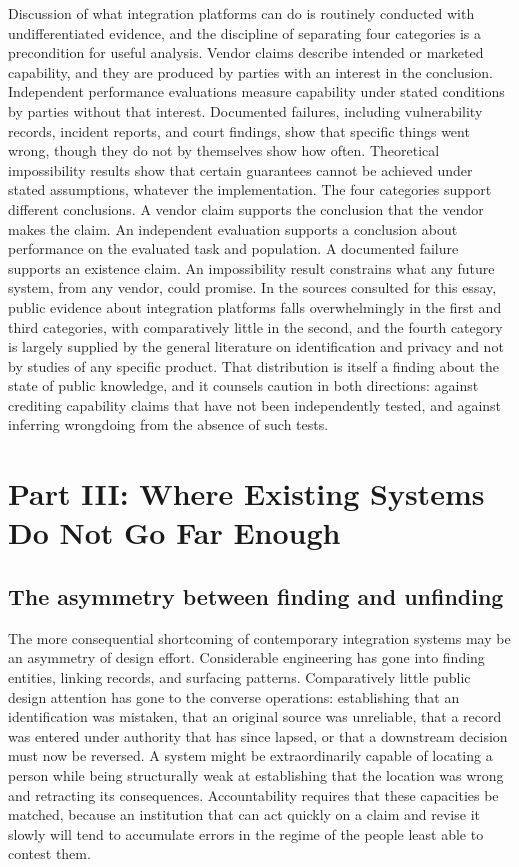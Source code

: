 \documentclass[11pt]{article}
\theoremstyle{plain}
\theoremstyle{definition}
\theoremstyle{remark}
\begin{document}
Discussion of what integration platforms can do is routinely conducted with undifferentiated evidence, and the discipline of separating four categories is a precondition for useful analysis. Vendor claims describe intended or marketed capability, and they are produced by parties with an interest in the conclusion. Independent performance evaluations measure capability under stated conditions by parties without that interest. Documented failures, including vulnerability records, incident reports, and court findings, show that specific things went wrong, though they do not by themselves show how often. Theoretical impossibility results show that certain guarantees cannot be achieved under stated assumptions, whatever the implementation. The four categories support different conclusions. A vendor claim supports the conclusion that the vendor makes the claim. An independent evaluation supports a conclusion about performance on the evaluated task and population. A documented failure supports an existence claim. An impossibility result constrains what any future system, from any vendor, could promise. In the sources consulted for this essay, public evidence about integration platforms falls overwhelmingly in the first and third categories, with comparatively little in the second, and the fourth category is largely supplied by the general literature on identification and privacy and not by studies of any specific product. That distribution is itself a finding about the state of public knowledge, and it counsels caution in both directions: against crediting capability claims that have not been independently tested, and against inferring wrongdoing from the absence of such tests.

\section{Part III: Where Existing Systems Do Not Go Far Enough}

\subsection{The asymmetry between finding and unfinding}

The more consequential shortcoming of contemporary integration systems may be an asymmetry of design effort. Considerable engineering has gone into finding entities, linking records, and surfacing patterns. Comparatively little public design attention has gone to the converse operations: establishing that an identification was mistaken, that an original source was unreliable, that a record was entered under authority that has since lapsed, or that a downstream decision must now be reversed. A system might be extraordinarily capable of locating a person while being structurally weak at establishing that the location was wrong and retracting its consequences. Accountability requires that these capacities be matched, because an institution that can act quickly on a claim and revise it slowly will tend to accumulate errors in the regime of the people least able to contest them.
\end{document}
